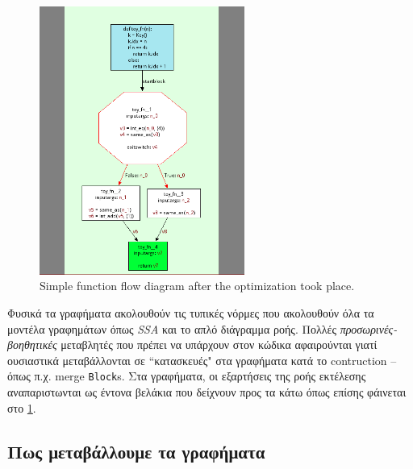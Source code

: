 \begin{figure}[h]
\centering
\includegraphics[width=0.6\textwidth]{simple-func-after.png}
\caption{Simple function flow diagram after the optimization took place.}
\label{figure-3}
\end{figure}

Φυσικά τα γραφήματα ακολουθούν τις τυπικές νόρμες που ακολουθούν όλα τα
μοντέλα γραφημάτων όπως \textit{SSA} και το απλό διάγραμμα ροής. Πολλές
\textit {προσωρινές-βοηθητικές} μεταβλητές που πρέπει να υπάρχουν στον κώδικα
αφαιρούνται γιατί ουσιαστικά μεταβάλλονται σε ``κατασκευές" στα γραφήματα κατά
το contruction – όπως π.χ. merge \texttt{Block}s. Στα γραφήματα, οι εξαρτήσεις
της ροής εκτέλεσης αναπαριστωνται ως έντονα βελάκια που δείχνουν προς τα κάτω
όπως επίσης φάινεται στο \ref{figure-3}.

\subsection{Πως μεταβάλλουμε τα γραφήματα}

